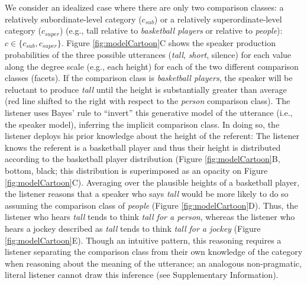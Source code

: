 \documentclass[doc, floatsintext]{apa6}
\begin{document}

We consider an idealized case where there are only two comparison classes: a relatively subordinate-level category ($c_{sub}$) or a relatively superordinate-level category ($c_{super}$) (e.g., tall relative to \emph{basketball players} or relative to \emph{people}): \(c \in \{c_{sub}, c_{super}\}\).
Figure \ref{fig:modelCartoon}C shows the speaker production probabilities of the three possible utterances (\emph{tall}, \emph{short}, silence) for each value along the degree scale (e.g., each height) for each of the two different comparison classes (facets).
If the comparison class is \emph{basketball players}, the speaker will be reluctant to produce \emph{tall} until the height is substantially greater than average (red line shifted to the right with respect to the \emph{person} comparison class).
The listener uses Bayes' rule to ``invert'' this generative model of the utterance (i.e., the speaker model), inferring the implicit comparison class.
In doing so, the listener deploys his prior knowledge about the height of the referent: The listener knows the referent is a basketball player and thus their height is distributed according to the basketball player distribution (Figure \ref{fig:modelCartoon}B, bottom, black; this distribution is superimposed as an opacity on Figure \ref{fig:modelCartoon}C).
Averaging over the plausible heights of a basketball player, the listener reasons that a speaker who says \emph{tall} would be more likely to do so assuming the comparison class of \emph{people}  (Figure \ref{fig:modelCartoon}D).
Thus, the listener who hears \emph{tall} tends to think \emph{tall for a person}, whereas the listener who hears a jockey described as \emph{tall} tends to think \emph{tall for a jockey} (Figure \ref{fig:modelCartoon}E).
Though an intuitive pattern, this reasoning requires a listener separating the comparison class from their own knowledge of the category when reasoning about the meaning of the utterance; an analogous non-pragmatic, literal listener cannot draw this inference (see Supplementary Information).

\end{document}
